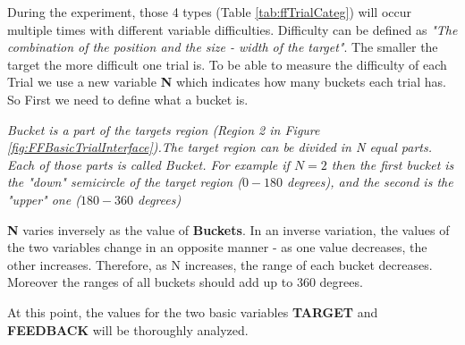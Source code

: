 During the experiment, those 4 types (Table \ref{tab:ffTrialCateg}) will occur multiple times with different variable difficulties. Difficulty can be defined as \emph{"The combination of the position and the size - width of the target"}. The smaller the target the more difficult one trial is. To be able to measure the difficulty of each Trial we use a new variable \textbf{N} which indicates how many buckets each trial has. So First we need to define what a bucket is.

\emph{Bucket is a part of the targets region (Region 2 in Figure \ref{fig:FFBasicTrialInterface}).The target region can be divided in N equal parts. Each of those parts is called Bucket. For example if $N=2$ then the first bucket is the "down" semicircle of the target region ($0-180$ degrees), and the second is the "upper" one ($180-360$ degrees)}

\textbf{N} varies inversely as the value of \textbf{Buckets}. In an inverse variation, the values of the two variables change in an opposite manner - as one value decreases, the other increases. Therefore, as N increases, the range of each bucket decreases. Moreover the ranges of all buckets should add up to 360 degrees. 

At this point, the values for the two basic variables \textbf{TARGET} and \textbf{FEEDBACK} will be thoroughly analyzed.




